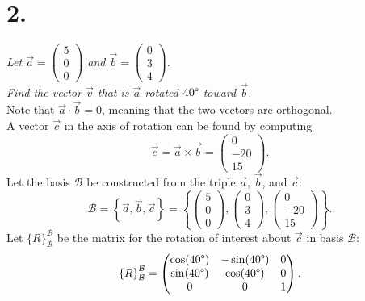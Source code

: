 \documentclass[12pt]{article}
\begin{document}
\section*{2.}
\textit{Let $\vec{a} = \begin{pmatrix} 5 \\ 0 \\ 0 \end{pmatrix}$ and
$\vec{b} = \begin{pmatrix} 0 \\ 3 \\ 4 \end{pmatrix}$. \\
Find the vector $\vec{v}$ that is $\vec{a}$ rotated $40 \degree$ toward
$\vec{b}$.} \\[\baselineskip]
Note that $\vec{a} \cdot \vec{b} = 0$, meaning that the two vectors are
orthogonal. \\
A vector $\vec{c}$ in the axis of rotation can be found by computing
\begin{equation*}
	\vec{c}
	=
	\vec{a} \times \vec{b}
	=
	\begin{pmatrix} 0 \\ -20 \\ 15 \end{pmatrix}
	.
\end{equation*}
Let the basis $\mathcal{B}$ be constructed from the triple $\vec{a}$,
$\vec{b}$, and $\vec{c}$:
\begin{equation*}
	\mathcal{B}
	=
	\left\{ \vec{a}, \vec{b}, \vec{c} \right\}
	=
	\left\{
		\begin{pmatrix} 5 \\ 0 \\ 0 \end{pmatrix},
		\begin{pmatrix} 0 \\ 3 \\ 4 \end{pmatrix},
		\begin{pmatrix} 0 \\ -20 \\ 15 \end{pmatrix}
	\right\}
	.
\end{equation*}
Let ${\{R\}}_{\mathcal{B}}^{\mathcal{B}}$ be the matrix for the rotation of
interest about $\vec{c}$ in basis $\mathcal{B}$:
\begin{equation*}
	{\{R\}}_{\mathcal{B}}^{\mathcal{B}}
	=
	\begin{pmatrix}
		\cos(40 \degree) & -\sin(40 \degree) & 0 \\
		\sin(40 \degree) & \cos(40 \degree) & 0 \\
		0 & 0 & 1
	\end{pmatrix}
	.
\end{equation*}
\end{document}
